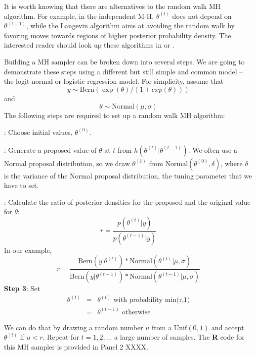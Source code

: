 It is worth
knowing that there are alternatives to the random walk MH algorithm. For
example, in the independent M-H, $\theta^{(t)}$ does not depend on
$\theta^{(t-1)}$, while the Langevin algorithm \citep{roberts_etal:1998}
aims at avoiding the random walk by favoring moves towards regions of
higher posterior probability density. The interested reader should
look up these algorithms in \citet{robert_casella:2004} or
\citet{robert_casella:2010}.

Building a MH sampler can be broken down into several steps. We are going to demonstrate these steps using a different but still simple and common model – the logit-normal or logistic regression model. For simplicity, assume that
\[
y \sim \mbox{Bern}(\exp(\theta)/(1+ exp(\theta)))
\]
and
\[
\theta \sim \mbox{Normal}(\mu, \sigma)
\]
The following steps are required to set up a random walk MH algorithm:

{: Choose initial values, $\theta^{(0)}$.}

{: Generate a proposed value of $\theta$ at $t$ from $h(\theta^{(t)}|\theta^{(t-1)})$. }
We often use a Normal proposal distribution, so we draw $\theta^{(1)}$ from $\mbox{Normal}(\theta^{(0)}, \delta)$, where $\delta$ is the variance of the Normal proposal distribution, the tuning parameter that we have to set.

{: Calculate the ratio of posterior densities for the proposed and the original value for $\theta$: }
\[
r = \frac{p(\theta^{(t)}|y)}  {p(\theta^{(t-1)}|y)}
\]
In our example,
\[
r = \frac{\mbox{Bern}(y|\theta^{(t)}) * \mbox{Normal}(\theta^{(t)}|\mu, \sigma)} {\mbox{Bern}(y|\theta^{(t-1)}) * \mbox{Normal}(\theta^{(t-1)}|\mu, \sigma)}
\]
{\bf Step 3}: Set
\begin{eqnarray*}
\theta^{(t)}  &= &   \theta^{(t)} \mbox{ with probability min(r,1)}\\
	 & = & 	\theta^{(t-1)} \mbox{ otherwise }
\end{eqnarray*}



We can do that by drawing a random number $u$ from a
$\mbox{Unif}(0,1)$ and accept $\theta^{(t)}$ if
$u<r$.
Repeat for $t = 1,2,\ldots$ a large number of samples.
The {\bf R} code for this MH sampler is provided in Panel 2 XXXX.

